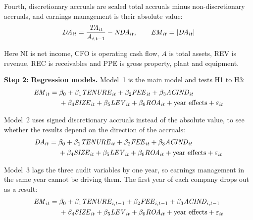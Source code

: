 Fourth, discretionary accruals are scaled total accruals minus non-discretionary accruals, and earnings management is their absolute value:
\begin{equation}
  \mathit{DA}_{it} = \frac{\mathit{TA}_{it}}{A_{i,t-1}} - \mathit{NDA}_{it},
  \qquad
  \mathit{EM}_{it} = \lvert \mathit{DA}_{it} \rvert
\end{equation}

Here NI is net income, CFO is operating cash flow, $A$ is total assets, REV is revenue, REC is receivables and PPE is gross property, plant and equipment.

\textbf{Step 2: Regression models.} Model~1 is the main model and tests H1 to H3:
\begin{equation}
  \begin{split}
    \mathit{EM}_{it} ={}& \beta_0 + \beta_1\mathit{TENURE}_{it} + \beta_2\mathit{FEE}_{it} + \beta_3\mathit{ACIND}_{it} \\
    &+ \beta_4\mathit{SIZE}_{it} + \beta_5\mathit{LEV}_{it} + \beta_6\mathit{ROA}_{it} + \text{year effects} + \varepsilon_{it}
  \end{split}
\end{equation}

Model~2 uses signed discretionary accruals instead of the absolute value, to see whether the results depend on the direction of the accruals:
\begin{equation}
  \begin{split}
    \mathit{DA}_{it} ={}& \beta_0 + \beta_1\mathit{TENURE}_{it} + \beta_2\mathit{FEE}_{it} + \beta_3\mathit{ACIND}_{it} \\
    &+ \beta_4\mathit{SIZE}_{it} + \beta_5\mathit{LEV}_{it} + \beta_6\mathit{ROA}_{it} + \text{year effects} + \varepsilon_{it}
  \end{split}
\end{equation}

Model~3 lags the three audit variables by one year, so earnings management in the same year cannot be driving them. The first year of each company drops out as a result:
\begin{equation}
  \begin{split}
    \mathit{EM}_{it} ={}& \beta_0 + \beta_1\mathit{TENURE}_{i,t-1} + \beta_2\mathit{FEE}_{i,t-1} + \beta_3\mathit{ACIND}_{i,t-1} \\
    &+ \beta_4\mathit{SIZE}_{it} + \beta_5\mathit{LEV}_{it} + \beta_6\mathit{ROA}_{it} + \text{year effects} + \varepsilon_{it}
  \end{split}
\end{equation}

